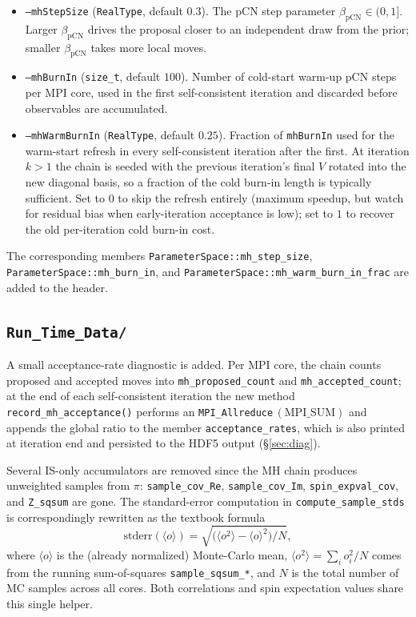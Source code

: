 \documentclass[11pt]{article}
\newcommand{\file}[1]{\texttt{#1}}
\newcommand{\code}[1]{\texttt{#1}}
\begin{document}
\begin{itemize}
    \item \code{--mhStepSize} (\code{RealType}, default $0.3$).  The pCN step
          parameter $\beta_{\mathrm{pCN}}\in(0,1]$.  Larger $\beta_{\mathrm{pCN}}$
          drives the proposal closer to an independent draw from the prior; smaller
          $\beta_{\mathrm{pCN}}$ takes more local moves.
    \item \code{--mhBurnIn} (\code{size\_t}, default $100$).  Number of cold-start
          warm-up pCN steps per MPI core, used in the first self-consistent iteration
          and discarded before observables are accumulated.
    \item \code{--mhWarmBurnIn} (\code{RealType}, default $0.25$).  Fraction of
          \code{mhBurnIn} used for the warm-start refresh in every self-consistent
          iteration after the first.  At iteration $k>1$ the chain is seeded with the
          previous iteration's final $V$ rotated into the new diagonal basis, so a
          fraction of the cold burn-in length is typically sufficient.  Set to $0$
          to skip the refresh entirely (maximum speedup, but watch for residual bias
          when early-iteration acceptance is low); set to $1$ to recover the old
          per-iteration cold burn-in cost.
\end{itemize}

The corresponding members \code{ParameterSpace::mh\_step\_size},
\code{ParameterSpace::mh\_burn\_in}, and
\code{ParameterSpace::mh\_warm\_burn\_in\_frac} are added to the header.

\subsection{\file{Run\_Time\_Data/}}

A small acceptance-rate diagnostic is added.  Per MPI core, the chain counts
proposed and accepted moves into \code{mh\_proposed\_count} and
\code{mh\_accepted\_count}; at the end of each self-consistent iteration the new
method \code{record\_mh\_acceptance()} performs an
\code{MPI\_Allreduce}\,$(\mathrm{MPI\_SUM})$ and appends the global ratio to the
member \code{acceptance\_rates}, which is also printed at iteration end and
persisted to the HDF5 output (\S\ref{sec:diag}).

Several IS-only accumulators are removed since the MH chain produces unweighted
samples from $\pi$: \code{sample\_cov\_Re}, \code{sample\_cov\_Im},
\code{spin\_expval\_cov}, and \code{Z\_sqsum} are gone.  The standard-error
computation in \code{compute\_sample\_stds} is correspondingly rewritten as the
textbook formula
\begin{equation}
    \mathrm{stderr}(\langle o\rangle)
    = \sqrt{ \bigl( \langle o^2\rangle - \langle o\rangle^2 \bigr) / N },
\end{equation}
where $\langle o\rangle$ is the (already normalized) Monte-Carlo mean,
$\langle o^2\rangle = \sum_i o_i^2 / N$ comes from the running sum-of-squares
\code{sample\_sqsum\_*}, and $N$ is the total number of MC samples across all
cores.  Both correlations and spin expectation values share this single helper.
\end{document}
